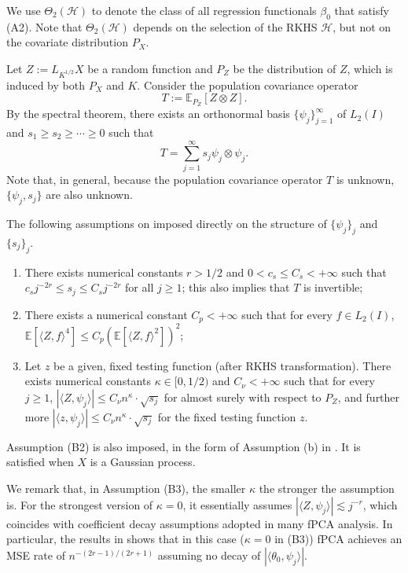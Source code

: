 \documentclass[11pt,a4paper]{article}
\theoremstyle{definition}
\theoremstyle{plain}
\theoremstyle{remark}
\newcommand{\mH}{\mathcal H}
\begin{document}
We use $\Theta_2(\mH)$ to denote the class of all regression functionals $\beta_0$ that satisfy (A2). Note that $\Theta_2(\mH)$ depends on the selection of the RKHS $\mH$, but not on the covariate distribution $P_X$.

Let $Z:=L_{K^{1/2}}X$ be a random function and $P_Z$ be the distribution of $Z$, which is induced by both $P_X$ and $K$. Consider the population covariance operator
$$
T := \mathbb E_{P_Z}\left[Z\otimes Z\right].
$$
By the spectral theorem, there exists an orthonormal basis $\{\psi_j\}_{j=1}^{\infty}$ of $L_2(I)$ and $s_1\geq s_2\geq\cdots\geq 0$ such that
\begin{equation}
T = \sum_{j=1}^{\infty} s_j\psi_j\otimes\psi_j.
\label{eq:specT}
\end{equation}
Note that, in general, because the population covariance operator $T$ is unknown, $\{\psi_j,s_j\}$ are also unknown.

The following assumptions on imposed directly on the structure of $\{\psi_j\}_j$ and $\{s_j\}_j$.
\begin{enumerate}
\item[(B1)] There exists numerical constants $r>1/2$ and $0<c_s\leq C_s<+\infty$ such that $c_s j^{-2r}\leq s_j\leq C_sj^{-2r}$ for all $j\geq 1$;
this also implies that $T$ is invertible;
\item[(B2)] There exists a numerical constant $C_p<+\infty$ such that for every $f\in L_2(I)$, $\mathbb E[\langle Z,f\rangle^4] \leq C_p(\mathbb E[\langle Z,f\rangle^2])^2$;
\item[(B3)] Let $z$ be a given, fixed testing function (after RKHS transformation). There exists numerical constants $\kappa\in[0,1/2)$ and $C_\nu<+\infty$ such that for every $j\geq 1$, $|\langle Z,\psi_j\rangle| \leq C_\nu n^{\kappa}\cdot \sqrt{s_j}$ for almost surely with respect to $P_Z$,
and further more $|\langle z,\psi_j\rangle|\leq C_\nu n^\kappa\cdot \sqrt{s_j}$ for the fixed testing function $z$.
\end{enumerate}

Assumption (B2) is also imposed, in the form of Assumption (b) in \citep{yuan2010reproducing}. It is satisfied when $X$ is a Gaussian process.

We remark that, in Assumption (B3), the smaller $\kappa$ the stronger the assumption is. For the strongest version of $\kappa=0$, it essentially assumes $|\langle Z,\psi_j\rangle|\lesssim j^{-r}$,
which coincides with coefficient decay assumptions adopted in many fPCA analysis.
{\color{red}In particular, the results in \cite{cai2006prediction} shows that in this case ($\kappa=0$ in (B3)) fPCA achieves an MSE rate of $n^{-(2r-1)/(2r+1)}$ assuming no decay of $|\langle\theta_0,\psi_j\rangle|$.}
\end{document}

